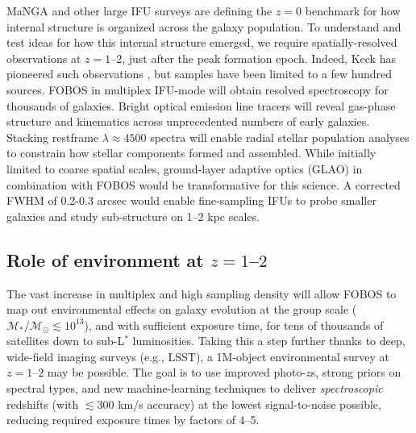 MaNGA \citep{bundy15} and other large IFU surveys are defining the
$z=0$ benchmark for how internal structure is organized across the
galaxy population. To understand and test ideas for how this internal
structure emerged, we require spatially-resolved observations at $z =
1$--2, just after the peak formation epoch. Indeed, Keck has
pioneered such observations \citep[e.g.,][]{erb04, miller11,law09},
but samples have been limited to a few hundred sources. FOBOS in
multiplex IFU-mode will obtain resolved spectroscopy for thousands of
galaxies. Bright optical emission line tracers will reveal gas-phase
structure and kinematics across unprecedented numbers of early
galaxies. Stacking restframe $\lambda \approx 4500$ spectra will
enable radial stellar population analyses to constrain how stellar
components formed and assembled. While initially limited to coarse
spatial scales, ground-layer adaptive optics (GLAO) in combination with FOBOS would be
transformative for this science. A corrected FWHM of 0.2-0.3 arcsec
would enable fine-sampling IFUs to probe smaller galaxies and study
sub-structure on 1--2 kpc scales.

\subsection{Role of environment at $z=1$--$2$ }

The vast increase in multiplex and high
sampling density will allow FOBOS to map out environmental effects on galaxy evolution at
the group scale ($\mathcal{M_\ast/M_\odot} \lesssim 10^{13}$), and
with sufficient exposure time, for tens of thousands of satellites
down to sub-L$^*$ luminosities. Taking this a step further thanks to
deep, wide-field imaging surveys (e.g., LSST), a 1M-object environmental survey at $z=1$--$2$ may be possible. The
goal is to use improved photo-$z$s, strong priors on spectral types,
and new machine-learning techniques to deliver {\it spectroscopic}
redshifts (with $\lesssim$300 km/s accuracy) at the lowest
signal-to-noise possible, reducing required exposure times by factors of 4--5.



